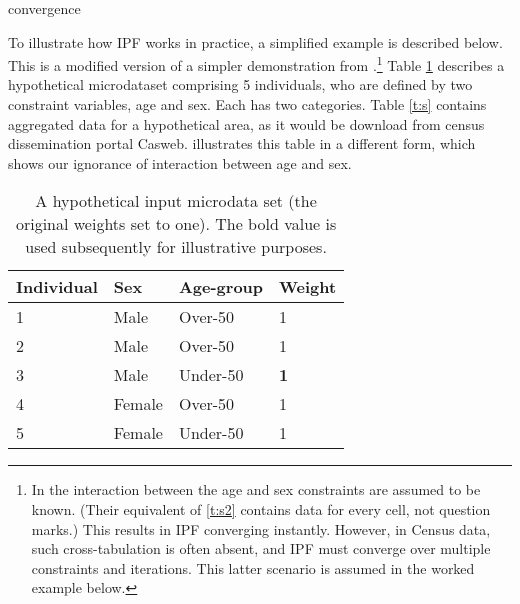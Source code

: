 \documentclass[a4paper,10pt]{article}
\begin{document}
%
%
%
%
%
%
%
convergence

To illustrate how IPF works in practice, a simplified example is described
below.
This is a modified version of a simpler demonstration from
\citet{Ballas2005}.\footnote{In \citet{Ballas2005}
the interaction between the age and sex constraints are assumed to be known.
(Their equivalent of \cref{t:s2} contains data for every cell,
not question marks.) This results in IPF converging instantly.
However, in Census data, such cross-tabulation is
often absent, and IPF must converge over multiple constraints and
iterations. This latter scenario is assumed in the worked example below.}
Table \ref{t:w}  describes a
hypothetical microdataset comprising 5 individuals, who are defined by two
constraint variables, age and sex. Each has two categories.
Table \ref{t:s} contains aggregated data
for a hypothetical area, as it would be download from census dissemination
portal Casweb.  illustrates this table in a different form,
which shows our ignorance of interaction between age and sex.


\begin{table}[h]
\centering
\caption{A hypothetical input microdata set (the original
weights set to one). The bold value is used subsequently for
illustrative purposes.}
\begin{tabular}{llll}
\toprule
{Individual } & {Sex} & {Age-group} & {Weight} \\
\midrule
1 & Male & Over-50 & 1 \\
2 & Male & Over-50 & 1 \\
3 & {Male} & {Under-50} & \textbf{1} \\
4 & Female & Over-50 & 1 \\
5 & Female & Under-50 & 1 \\
\bottomrule
\end{tabular}
\label{t:w}
\end{table}
\vspace{1cm}
\end{document}
